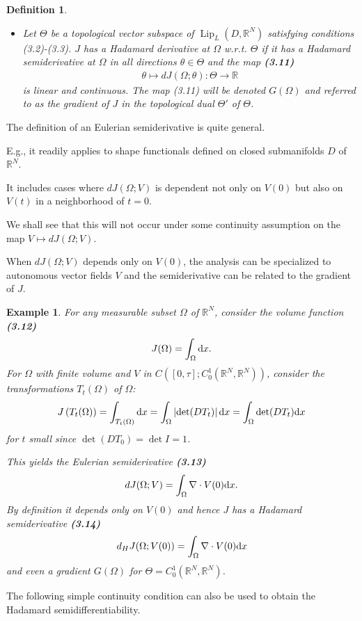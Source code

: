 \documentclass[oneside]{book}
\numberwithin{equation}{section}
\newtheorem{definition}{Definition}[section]
\newtheorem{example}{Example}[section]
\begin{document}
\begin{definition}
\begin{itemize}
        \item[(iii)] Let $\Theta$ be a topological vector subspace of $\operatorname{Lip}_L(D,\mathbb{R}^N)$ satisfying conditions (3.2)-(3.3). $J$ has a \emph{Hadamard derivative} at $\Omega$ w.r.t. $\Theta$ if it has a Hadamard semiderivative at $\Omega$ in all directions $\theta\in\Theta$ and the map \textbf{(3.11)}
        \begin{align*}
            \theta\mapsto dJ(\Omega;\theta):\Theta\to\mathbb{R}
        \end{align*}
        is linear and continuous. The map (3.11) will be denoted $G(\Omega)$ and referred to as the \emph{gradient} of $J$ in the topological dual $\Theta'$ of $\Theta$.
    \end{itemize}
\end{definition}
The definition of an Eulerian semiderivative is quite general.

E.g., it readily applies to shape functionals defined on closed submanifolds $D$ of $\mathbb{R}^N$.

It includes cases where $dJ(\Omega;V)$ is dependent not only on $V(0)$ but also on $V(t)$ in a neighborhood of $t = 0$.

We shall see that this will not occur under some continuity assumption on the map $V\mapsto dJ(\Omega;V)$.

When $dJ(\Omega;V)$ depends only on $V(0)$, the analysis can be specialized to autonomous vector fields $V$ and the semiderivative can be related to the gradient of $J$.

\begin{example}
    For any measurable subset $\Omega$ of $\mathbb{R}^N$, consider the volume function \textbf{(3.12)}
    \begin{align*}
        J(\Omega) = \int_\Omega {\rm d}x.
    \end{align*}
    For $\Omega$ with finite volume and $V$ in $C([0,\tau];C_0^1(\mathbb{R}^N,\mathbb{R}^N))$, consider the transformations $T_t(\Omega)$ of $\Omega$:
    \begin{align*}
        J\left(T_t(\Omega)\right) = \int_{T_t(\Omega)} {\rm d}x = \int_\Omega \left|\det(DT_t)\right|{\rm d}x = \int_\Omega \det(DT_t){\rm d}x
    \end{align*}
    for $t$ small since $\det(DT_0) = \det I = 1$.
    
    This yields the Eulerian semiderivative \textbf{(3.13)}
    \begin{align*}
        dJ(\Omega;V) = \int_\Omega \nabla\cdot V(0){\rm d}x.
    \end{align*}
    By definition it depends only on $V(0)$ and hence $J$ has a Hadamard semiderivative \textbf{(3.14)}
    \begin{align*}
        d_HJ(\Omega;V(0)) = \int_\Omega \nabla\cdot V(0){\rm d}x
    \end{align*}
    and even a gradient $G(\Omega)$ for $\Theta = C_0^1(\mathbb{R}^N,\mathbb{R}^N)$.
\end{example}
The following simple continuity condition can also be used to obtain the Hadamard semidifferentiability.
\end{document}
